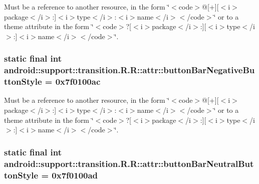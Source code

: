 Must be a reference to another resource, in the form \char`\"{}$<$code$>$@\mbox{[}+\mbox{]}\mbox{[}$<$i$>$package$<$/i$>$:\mbox{]}$<$i$>$type$<$/i$>$:$<$i$>$name$<$/i$>$$<$/code$>$\char`\"{} or to a theme attribute in the form \char`\"{}$<$code$>$?\mbox{[}$<$i$>$package$<$/i$>$:\mbox{]}\mbox{[}$<$i$>$type$<$/i$>$:\mbox{]}$<$i$>$name$<$/i$>$$<$/code$>$\char`\"{}. \hypertarget{classandroid_1_1support_1_1transition_1_1_r_1_1attr_92ca34cc3aa0cd21a60ec760e2835f1b}{
\subsubsection[{buttonBarNegativeButtonStyle}]{\setlength{\rightskip}{0pt plus 5cm}static final int android::support::transition.R.R::attr::buttonBarNegativeButtonStyle = 0x7f0100ac}}
\label{classandroid_1_1support_1_1transition_1_1_r_1_1attr_92ca34cc3aa0cd21a60ec760e2835f1b}


Must be a reference to another resource, in the form \char`\"{}$<$code$>$@\mbox{[}+\mbox{]}\mbox{[}$<$i$>$package$<$/i$>$:\mbox{]}$<$i$>$type$<$/i$>$:$<$i$>$name$<$/i$>$$<$/code$>$\char`\"{} or to a theme attribute in the form \char`\"{}$<$code$>$?\mbox{[}$<$i$>$package$<$/i$>$:\mbox{]}\mbox{[}$<$i$>$type$<$/i$>$:\mbox{]}$<$i$>$name$<$/i$>$$<$/code$>$\char`\"{}. \hypertarget{classandroid_1_1support_1_1transition_1_1_r_1_1attr_57cb7b8da17ad820c4ef48c99f1e9a61}{
\subsubsection[{buttonBarNeutralButtonStyle}]{\setlength{\rightskip}{0pt plus 5cm}static final int android::support::transition.R.R::attr::buttonBarNeutralButtonStyle = 0x7f0100ad}}
\label{classandroid_1_1support_1_1transition_1_1_r_1_1attr_57cb7b8da17ad820c4ef48c99f1e9a61}


